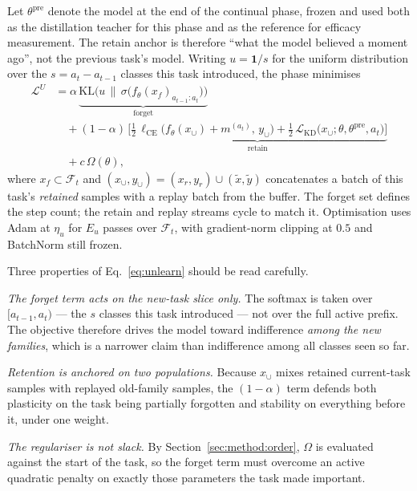 Let $\theta^{\text{pre}}$ denote the model at the end of the continual phase,
frozen and used both as the distillation teacher for this phase and as the
reference for efficacy measurement. The retain anchor is therefore ``what the
model believed a moment ago'', not the previous task's model. Writing
$u = \mathbf{1}/s$ for the uniform distribution over the $s = a_t - a_{t-1}$
classes this task introduced, the phase minimises
\begin{align}
  \label{eq:unlearn}
  \mathcal{L}^{U}
   &= \alpha\,
      \underbrace{\mathrm{KL}\!\Big(u \,\Big\|\,
        \sigma\big(f_\theta(x_f)_{a_{t-1}:a_t}\big)\Big)}_{\text{forget}}
      \nonumber\\
   &\quad + (1-\alpha)\,
      \underbrace{\Big[
        \tfrac{1}{2}\,\ell_{\mathrm{CE}}\big(f_\theta(x_\cup) + m^{(a_t)},\, y_\cup\big)
        + \tfrac{1}{2}\,\mathcal{L}_{\mathrm{KD}}\big(x_\cup; \theta, \theta^{\text{pre}}, a_t\big)
      \Big]}_{\text{retain}}
      \nonumber\\
   &\quad + c\,\Omega(\theta),
\end{align}
where $x_f \subset \mathcal{F}_t$ and
$(x_\cup, y_\cup) = (x_r,y_r) \cup (\tilde{x},\tilde{y})$ concatenates a batch of
this task's \emph{retained} samples with a replay batch from the buffer. The
forget set defines the step count; the retain and replay streams cycle to match
it. Optimisation uses Adam at $\eta_u$ for $E_u$ passes over $\mathcal{F}_t$,
with gradient-norm clipping at $0.5$ and BatchNorm still frozen.

Three properties of Eq.~\eqref{eq:unlearn} should be read carefully.

\emph{The forget term acts on the new-task slice only.} The softmax is taken over
$[a_{t-1}, a_t)$ --- the $s$ classes this task introduced --- not over the full
active prefix. The objective therefore drives the model toward indifference
\emph{among the new families}, which is a narrower claim than indifference among
all classes seen so far.

\emph{Retention is anchored on two populations.} Because $x_\cup$ mixes retained
current-task samples with replayed old-family samples, the $(1-\alpha)$ term
defends both plasticity on the task being partially forgotten and stability on
everything before it, under one weight.

\emph{The regulariser is not slack.} By Section~\ref{sec:method:order}, $\Omega$
is evaluated against the start of the task, so the forget term must overcome an
active quadratic penalty on exactly those parameters the task made important.

